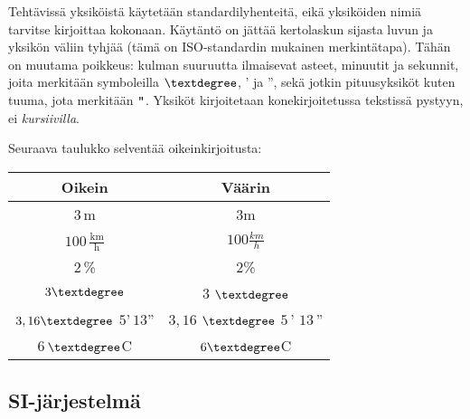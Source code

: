 
Tehtävissä yksiköistä käytetään standardilyhenteitä, eikä yksiköiden nimiä tarvitse kirjoittaa kokonaan. Käytäntö on jättää kertolaskun sijasta luvun ja yksikön väliin tyhjää (tämä on ISO-standardin mukainen merkintätapa). %
Tähän on muutama poikkeus: kulman suuruutta ilmaisevat asteet, minuutit ja sekunnit, joita merkitään symboleilla $\textdegree$, ' ja '', sekä jotkin pituusyksiköt kuten tuuma, jota merkitään ${\verb+"+}$. Yksiköt kirjoitetaan konekirjoitetussa tekstissä pystyyn, ei \textit{kursiivilla}.



Seuraava taulukko selventää oikeinkirjoitusta:

\begin{center}
\begin{tabular}{c|c}
Oikein & Väärin \\
\hline
$3$\,m & $3$m 	\\
$100$\,$\frac{\text{km}}{\text{h}}$ & $100\frac{km}{h}$	\\
$2$\,\% & $2$\% \\
$3\textdegree$ & $3$ $\textdegree$\\
$3,16\textdegree$ $5$'\,$13$'' & $3,16$ $\textdegree$ $5$\,' $13$\,'' 	\\
$6$\,$\textdegree$C & $6\textdegree$C 	\\
\end{tabular}
\end{center}


\subsection*{SI-järjestelmä}

